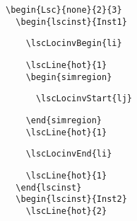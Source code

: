 \documentclass{article}
\begin{document}
\begin{center}%
\begin{minipage}{0.45\textwidth}
\end{minipage}
\hfill
\begin{minipage}{0.52\textwidth}%
\small%
{\gray\begin{verbatim}
\begin{Lsc}{none}{2}{3}
  \begin{lscinst}{Inst1}
\end{verbatim}}%
\verbunskip%
{\begin{verbatim}
    \lscLocinvBegin{li}
\end{verbatim}}%
\verbunskip%
{\gray\begin{verbatim}
    \lscLine{hot}{1}
    \begin{simregion}
\end{verbatim}}%
\verbunskip%
{\begin{verbatim}
      \lscLocinvStart{lj}
\end{verbatim}}%
\verbunskip%
{\gray\begin{verbatim}
    \end{simregion}
    \lscLine{hot}{1}
\end{verbatim}}%
\verbunskip%
{\begin{verbatim}
    \lscLocinvEnd{li}
\end{verbatim}}%
\verbunskip%
{\gray\begin{verbatim}
    \lscLine{hot}{1}
  \end{lscinst}
  \begin{lscinst}{Inst2}
    \lscLine{hot}{2}
\end{verbatim}}%

\end{minipage}
\end{center}
\end{document}
